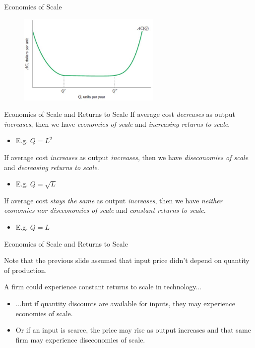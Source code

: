 \documentclass[11pt,t]{beamer}
\begin{document}
\begin{frame}{Economies of Scale}
  \begin{figure}
    \includegraphics[width=260px]{figures/fig8_11.jpg}
  \end{figure}
\end{frame}

\begin{frame}{Economies of Scale and Returns to Scale}
  If average cost \textit{decreases} as output \textit{increases}, then we have \textit{economies of scale} and \textit{increasing returns to scale}.

  \begin{itemize}
    \item E.g. $Q=L^2$
  \end{itemize}

  \bigskip\pause
  If average cost \textit{increases} as output \textit{increases}, then we have \textit{diseconomies of scale} and \textit{decreasing returns to scale}.

  \begin{itemize}
    \item E.g. $Q=\sqrt{L}$
  \end{itemize}

  \bigskip\pause
  If average cost \textit{stays the same} as output \textit{increases}, then we have\textit{ neither economies nor diseconomies of scale} and \textit{constant returns to scale}.

  \begin{itemize}
    \item E.g. $Q=L$
  \end{itemize}
\end{frame}

\begin{frame}{Economies of Scale and Returns to Scale}
  
  Note that the previous slide assumed that input price didn't depend on quantity of production.

  \bigskip
  A firm could experience constant returns to scale in technology...

  \begin{itemize}
    \item ...but if quantity discounts are available for inputs, they may experience economies of scale.
    
    \pause
    \item Or if an input is scarce, the price may rise as output increases and that same firm may experience diseconomies of scale.
  \end{itemize}
\end{frame}
\end{document}
